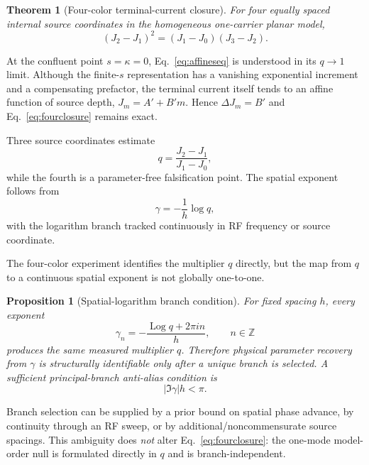 \documentclass[11pt]{article}
\newtheorem{theorem}{Theorem}
\newtheorem{proposition}{Proposition}
\begin{document}
\begin{theorem}[Four-color terminal-current closure]
For four equally spaced internal source coordinates in the homogeneous one-carrier planar model,
\begin{equation}
\boxed{(J_2-J_1)^2=(J_1-J_0)(J_3-J_2).}
\label{eq:fourclosure}
\end{equation}
\end{theorem}

At the confluent point $s=\kappa=0$, Eq.~\eqref{eq:affineseq} is understood in its $q\to1$ limit. Although the finite-$s$ representation has a vanishing exponential increment and a compensating prefactor, the terminal current itself tends to an affine function of source depth, $J_m=A'+B'm$. Hence $\Delta J_m=B'$ and Eq.~\eqref{eq:fourclosure} remains exact.

Three source coordinates estimate
\begin{equation}
\boxed{q=\frac{J_2-J_1}{J_1-J_0},}
\label{eq:qrecover}
\end{equation}
while the fourth is a parameter-free falsification point. The spatial exponent follows from
\begin{equation}
\boxed{\gamma=-\frac{1}{h}\log q,}
\label{eq:grecover}
\end{equation}
with the logarithm branch tracked continuously in RF frequency or source coordinate.

The four-color experiment identifies the multiplier $q$ directly, but the map from $q$ to a continuous spatial exponent is not globally one-to-one.
\begin{proposition}[Spatial-logarithm branch condition]
For fixed spacing $h$, every exponent
\begin{equation}
\boxed{\gamma_n=-\frac{\operatorname{Log}q+2\pi i n}{h},\qquad n\in\mathbb Z}
\label{eq:spatial_alias}
\end{equation}
produces the same measured multiplier $q$. Therefore physical parameter recovery from $\gamma$ is structurally identifiable only after a unique branch is selected. A sufficient principal-branch anti-alias condition is
\begin{equation}
\boxed{|\Im\gamma|h<\pi.}
\label{eq:spatial_antialias}
\end{equation}
\end{proposition}
Branch selection can be supplied by a prior bound on spatial phase advance, by continuity through an RF sweep, or by additional/noncommensurate source spacings. This ambiguity does \emph{not} alter Eq.~\eqref{eq:fourclosure}: the one-mode model-order null is formulated directly in $q$ and is branch-independent.
\end{document}

